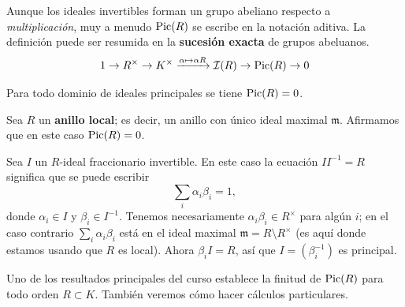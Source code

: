 Aunque los ideales invertibles forman un grupo abeliano respecto
a \emph{multiplicación}, muy a menudo $\operatorname{Pic} (R)$ se escribe en la notación
aditiva. La definición puede ser resumida en la \textbf{sucesión exacta}
de grupos abeluanos.
\[ 1 \to R^\times \to K^\times \xrightarrow{\alpha \mapsto \alpha R}
       \mathcal{I} (R) \to \operatorname{Pic} (R) \to 0 \]

\begin{ejemplo}
  Para todo dominio de ideales principales se tiene $\operatorname{Pic} (R) = 0$.
\end{ejemplo}

\begin{ejemplo}
  Sea $R$ un \textbf{anillo local}; es decir, un anillo con único ideal maximal
  $\mathfrak{m}$. Afirmamos que en este caso $\operatorname{Pic} (R) = 0$.

  Sea $I$ un $R$-ideal fraccionario invertible. En este caso la ecuación
  $I I^{-1} = R$ significa que se puede escribir
  $$\sum_i \alpha_i \beta_i = 1,$$
  donde $\alpha_i \in I$ y $\beta_i \in I^{-1}$. Tenemos necesariamente
  $\alpha_i \beta_i \in R^\times$ para algún $i$; en el caso contrario
  $\sum_i \alpha_i \beta_i$ está en el ideal maximal
  $\mathfrak{m} = R\setminus R^\times$ (es aquí donde estamos usando que $R$
  es local). Ahora $\beta_i I = R$, así que $I = (\beta_i^{-1})$ es principal.
\end{ejemplo}

Uno de los resultados principales del curso establece la finitud de $\operatorname{Pic} (R)$
para todo orden $R \subset K$. También veremos cómo hacer cálculos particulares.

